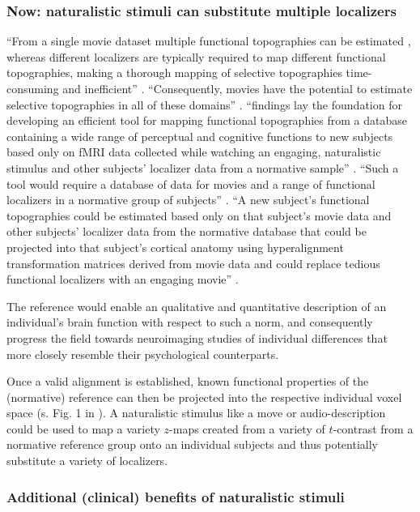\subsubsection{Now: naturalistic stimuli can substitute multiple localizers}
%
``From a single movie dataset multiple functional topographies can be estimated
\citep{guntupalli2016model}, whereas different localizers are typically required
to map different functional topographies, making a thorough mapping of selective
topographies time-consuming and inefficient'' \citep{jiahui2020predicting}.
%
``Consequently, movies have the potential to estimate selective topographies in
all of these domains'' \citep{jiahui2020predicting}.
%
``findings lay the foundation for developing an efficient tool for mapping
functional topographies from a database containing a wide range of perceptual
and cognitive functions to new subjects based only on fMRI data collected while
watching an engaging, naturalistic stimulus and other subjects' localizer data
from a normative sample'' \citep{jiahui2020predicting}.
%
``Such a tool would require a database of data for movies and a range of
functional localizers in a normative group of subjects''
\citep{jiahui2020predicting}.
%
``A new subject's functional topographies could be estimated based only on that
subject's movie data and other subjects' localizer data from the normative
database that could be projected into that subject's cortical anatomy using
hyperalignment transformation matrices derived from movie data and could replace
tedious functional localizers with an engaging movie''
\citep{jiahui2020predicting}.

%
The reference would enable an qualitative and quantitative description of an
individual's brain function with respect to such a norm, and consequently
progress the field towards neuroimaging studies of individual differences that
more closely resemble their psychological counterparts.

%
Once a valid alignment is established, known functional properties of the
(normative) reference can then be projected into the respective individual voxel
space (s. Fig. 1 in \citep{nishimoto2016lining}).
%
A naturalistic stimulus like a move or audio-description could be used to map a
variety $z$-maps created from a variety of $t$-contrast from a normative
reference group onto an individual subjects and thus potentially substitute a
variety of localizers.


\subsubsection{Additional (clinical) benefits of naturalistic stimuli}


